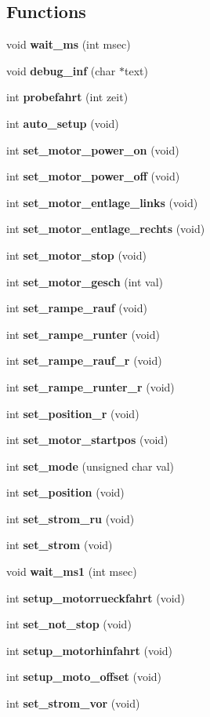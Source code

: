 \subsection*{Functions}
\begin{DoxyCompactItemize}
\item 
void \textbf{ wait\+\_\+ms} (int msec)
\item 
void \textbf{ debug\+\_\+inf} (char $\ast$text)
\item 
int \textbf{ probefahrt} (int zeit)
\item 
int \textbf{ auto\+\_\+setup} (void)
\item 
int \textbf{ set\+\_\+motor\+\_\+power\+\_\+on} (void)
\item 
int \textbf{ set\+\_\+motor\+\_\+power\+\_\+off} (void)
\item 
int \textbf{ set\+\_\+motor\+\_\+entlage\+\_\+links} (void)
\item 
int \textbf{ set\+\_\+motor\+\_\+entlage\+\_\+rechts} (void)
\item 
int \textbf{ set\+\_\+motor\+\_\+stop} (void)
\item 
int \textbf{ set\+\_\+motor\+\_\+gesch} (int val)
\item 
int \textbf{ set\+\_\+rampe\+\_\+rauf} (void)
\item 
int \textbf{ set\+\_\+rampe\+\_\+runter} (void)
\item 
int \textbf{ set\+\_\+rampe\+\_\+rauf\+\_\+r} (void)
\item 
int \textbf{ set\+\_\+rampe\+\_\+runter\+\_\+r} (void)
\item 
int \textbf{ set\+\_\+position\+\_\+r} (void)
\item 
int \textbf{ set\+\_\+motor\+\_\+startpos} (void)
\item 
int \textbf{ set\+\_\+mode} (unsigned char val)
\item 
int \textbf{ set\+\_\+position} (void)
\item 
int \textbf{ set\+\_\+strom\+\_\+ru} (void)
\item 
int \textbf{ set\+\_\+strom} (void)
\item 
void \textbf{ wait\+\_\+ms1} (int msec)
\item 
int \textbf{ setup\+\_\+motorrueckfahrt} (void)
\item 
int \textbf{ set\+\_\+not\+\_\+stop} (void)
\item 
int \textbf{ setup\+\_\+motorhinfahrt} (void)
\item 
int \textbf{ setup\+\_\+moto\+\_\+offset} (void)
\item 
int \textbf{ set\+\_\+strom\+\_\+vor} (void)
\end{DoxyCompactItemize}
